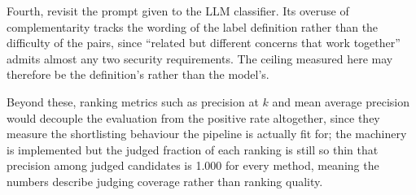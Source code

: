 Fourth, revisit the prompt given to the LLM classifier. Its overuse of
complementarity tracks the wording of the label definition rather than the
difficulty of the pairs, since ``related but different concerns that work
together'' admits almost any two security requirements. The ceiling measured here
may therefore be the definition's rather than the model's.

Beyond these, ranking metrics such as precision at $k$ and mean average precision
would decouple the evaluation from the positive rate altogether, since they
measure the shortlisting behaviour the pipeline is actually fit for; the
machinery is implemented but the judged fraction of each ranking is still so thin
that precision among judged candidates is 1.000 for every method, meaning the
numbers describe judging coverage rather than ranking quality.
